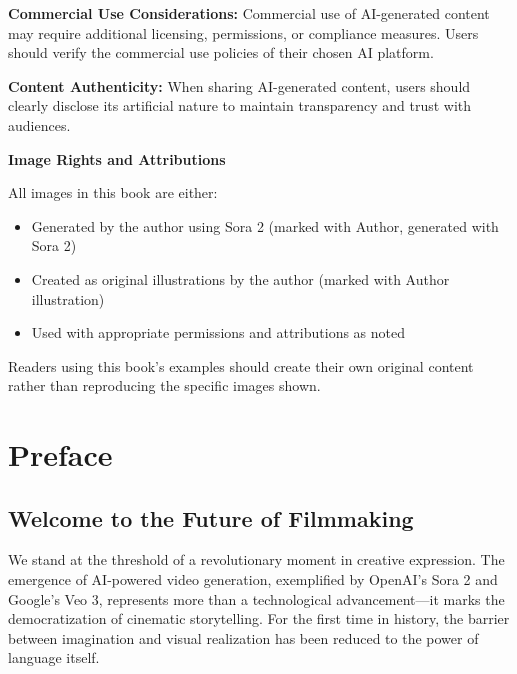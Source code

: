 \documentclass[11pt,a4paper,openright]{book}
\begin{document}
\textbf{Commercial Use Considerations:} Commercial use of AI-generated content may require additional licensing, permissions, or compliance measures. Users should verify the commercial use policies of their chosen AI platform.

\textbf{Content Authenticity:} When sharing AI-generated content, users should clearly disclose its artificial nature to maintain transparency and trust with audiences.

\vspace{0.5cm}

\textbf{Image Rights and Attributions}

All images in this book are either:
\begin{itemize}
\item Generated by the author using Sora 2 (marked with \textcopyright{} Author, generated with Sora 2)
\item Created as original illustrations by the author (marked with \textcopyright{} Author illustration)
\item Used with appropriate permissions and attributions as noted
\end{itemize}

Readers using this book's examples should create their own original content rather than reproducing the specific images shown.

\vspace*{\fill}


\chapter*{Preface}

\section*{Welcome to the Future of Filmmaking}

We stand at the threshold of a revolutionary moment in creative expression. The emergence of AI-powered video generation, exemplified by OpenAI's Sora 2 and Google's Veo 3, represents more than a technological advancement—it marks the democratization of cinematic storytelling. For the first time in history, the barrier between imagination and visual realization has been reduced to the power of language itself.
\end{document}
